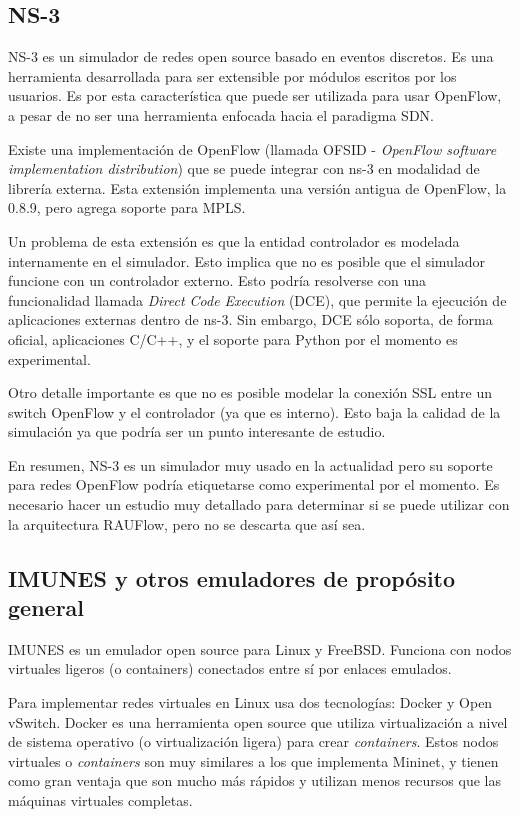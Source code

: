 \subsection{NS-3}
NS-3 es un simulador de redes open source basado en eventos discretos. Es una herramienta desarrollada para ser extensible por módulos escritos por los usuarios. Es por esta característica que puede ser utilizada para usar OpenFlow, a pesar de no ser una herramienta enfocada hacia el paradigma SDN.

Existe una implementación de OpenFlow \cite{ns-3-openflow} (llamada OFSID - \textit{OpenFlow software implementation distribution}) que se puede integrar con ns-3 en modalidad de librería externa. Esta extensión implementa una versión antigua de OpenFlow, la 0.8.9, pero agrega soporte para MPLS.

Un problema de esta extensión es que la entidad controlador es modelada internamente en el simulador. Esto implica que no es posible que el simulador funcione con un controlador externo. Esto podría resolverse con una funcionalidad llamada \textit{Direct Code Execution} (DCE), que permite la ejecución de aplicaciones externas dentro de ns-3. Sin embargo, DCE sólo soporta, de forma oficial, aplicaciones C/C++, y el soporte para Python por el momento es experimental.

Otro detalle importante es que no es posible modelar la conexión SSL entre un switch OpenFlow y el controlador (ya que es interno). Esto baja la calidad de la simulación ya que podría ser un punto interesante de estudio.

En resumen, NS-3 es un simulador muy usado en la actualidad pero su soporte para redes OpenFlow podría etiquetarse como experimental por el momento. Es necesario hacer un estudio muy detallado para determinar si se puede utilizar con la arquitectura RAUFlow, pero no se descarta que así sea.

\subsection{IMUNES y otros emuladores de propósito general}
IMUNES \cite{imunes} es un emulador open source para Linux y FreeBSD. Funciona con nodos virtuales ligeros (o containers) conectados entre sí por enlaces emulados.

Para implementar redes virtuales en Linux usa dos tecnologías: Docker y Open vSwitch. Docker es una herramienta open source que utiliza virtualización a nivel de sistema operativo (o virtualización ligera) para crear \textit{containers}. Estos nodos virtuales o \textit{containers} son muy similares a los que implementa Mininet, y tienen como gran ventaja que son mucho más rápidos y utilizan menos recursos que las máquinas virtuales completas.

